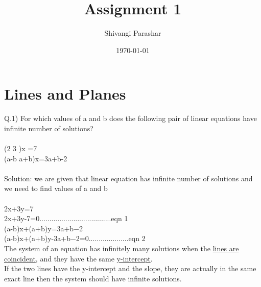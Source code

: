 \documentclass[12pt]{article}%
\begin{document}
\title{Assignment 1}
\author{Shivangi Parashar}
\date{\today}
\maketitle

\section{Lines and Planes}
 
Q.1) For which values of a and b does the following pair of linear equations have infinite number of solutions?\\
\\
(2 3 )x =7 \\
(a-b   a+b)x=3a+b-2
\\
\\
{Solution:}
we are given that linear equation has infinite number of solutions and we need to find values of a and b\\
\\
2x+3y=7\\
2x+3y-7=0....................................eqn 1\\
(a-b)x+(a+b)y=3a+b−2\\
(a-b)x+(a+b)y-3a+b−2=0....................eqn 2\\
The system of an equation has infinitely many solutions when the \underline{lines are coincident}, and they have the same \underline{y-intercept}. \\
If the two lines have the y-intercept and the slope, they are actually in the same exact line then the system should have infinite solutions.\\
\end{document}
